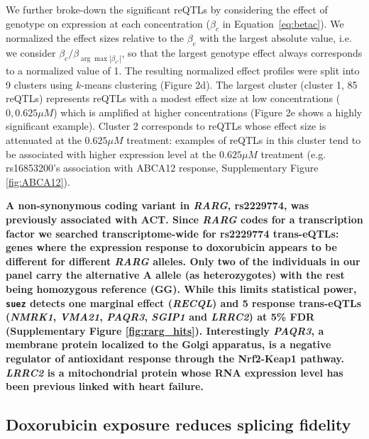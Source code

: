 \documentclass{article}
\newcommand{\tempbold}[1]{\textbf{#1}}
\begin{document}
We further broke-down the significant reQTLs by considering the effect of genotype on expression at each concentration ($\beta_c$ in Equation~\ref{eq:betac}). We normalized the effect sizes relative to the $\beta_c$ with the largest absolute value, i.e. we consider $\beta_c / \beta_{\arg \max{ |\beta_{c'}| }} $, so that the largest genotype effect always corresponds to a normalized value of 1. The resulting normalized effect profiles were split into 9 clusters using $k$-means clustering (Figure 2d). The largest cluster (cluster 1, 85 reQTLs) represents reQTLs with a modest effect size at low concentrations ($0,0.625\mu M$) which is amplified at higher concentrations (Figure 2e shows a highly significant example). Cluster 2 corresponds to reQTLs whose effect size is attenuated at the $0.625\mu M$ treatment: examples of reQTLs in this cluster tend to be associated with higher expression level at the $0.625\mu M$ treatment (e.g. rs16853200's association with ABCA12 response, Supplementary Figure \ref{fig:ABCA12}). 

\tempbold{ A non-synonymous coding variant in \emph{RARG}, rs2229774, was previously associated with ACT\cite{Aminkeng2015}. Since \emph{RARG} codes for a transcription factor we searched transcriptome-wide for rs2229774 trans-eQTLs: genes where the expression response to doxorubicin appears to be different for different \emph{RARG} alleles. Only two of the individuals in our panel carry the alternative A allele (as heterozygotes) with the rest being homozygous reference (GG). While this limits statistical power, \texttt{suez} detects one marginal effect (\emph{RECQL}) and 5 response trans-eQTLs (\emph{NMRK1}, \emph{VMA21}, \emph{PAQR3}, \emph{SGIP1} and \emph{LRRC2}) at 5\% FDR (Supplementary Figure \ref{fig:rarg_hits}). Interestingly \emph{PAQR3}, a membrane protein localized to the Golgi apparatus, is a negative regulator of antioxidant response through the Nrf2-Keap1 pathway\cite{Zhang2016-rz}. \emph{LRRC2} is a mitochondrial protein whose RNA expression level has been previous linked with heart failure\cite{McDermott-Roe2017-db}. }

\subsection*{Doxorubicin exposure reduces splicing fidelity}

\end{document}

